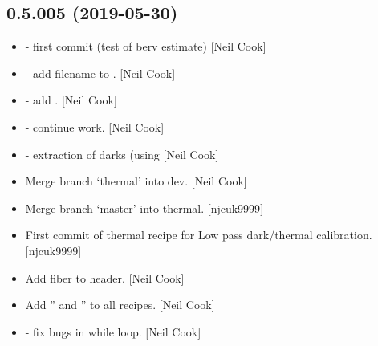 \documentclass[a4paper,10pt,english]{report}
\begin{document}
\subsection{0.5.005 (2019-05-30)}
\label{\detokenize{misc/changelog:id132}}\begin{itemize}
\item {} 
 - first commit (test of berv estimate) {[}Neil Cook{]}

\item {} 
 - add filename to . {[}Neil Cook{]}

\item {} 
 - add . {[}Neil Cook{]}

\item {} 
 - continue work. {[}Neil Cook{]}

\item {} 
 - extraction of darks (using  {[}Neil
Cook{]}

\item {} 
Merge branch ‘thermal’ into dev. {[}Neil Cook{]}

\item {} 
Merge branch ‘master’ into thermal. {[}njcuk9999{]}

\item {} 
First commit of thermal recipe for Low pass dark/thermal calibration.
{[}njcuk9999{]}

\item {} 
Add fiber to header. {[}Neil Cook{]}

\item {} 
Add ” and ” to all recipes. {[}Neil Cook{]}

\item {} 
 - fix bugs in while loop. {[}Neil Cook{]}

\end{itemize}
\end{document}
